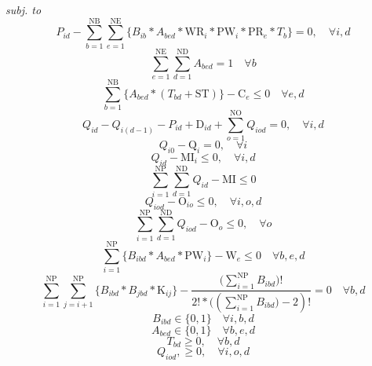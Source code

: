 \emph{subj. to}
\begin{equation}
	P_{id} - \sum_{b=1}^{\mathrm{NB}}{\sum_{e=1}^{\mathrm{NE}}\{B_{ib}*A_{bed}*\mathrm{WR}_i*\mathrm{PW}_i*\mathrm{PR}_e*T_{b}}\}  = 0, \quad \forall{i, d}
	\label{eq:prodQt}
\end{equation}
\begin{equation}
	\sum_{e=1}^{\mathrm{NE}}{\sum_{d=1}^{\mathrm{ND}}{A_{bed}}} = 1 \quad \forall{b}
	\label{eq:batchRest}
\end{equation}
\begin{equation}
	\sum_{b=1}^{\mathrm{NB}}\{A_{bed}*(T_{bd}+\mathrm{ST})\} - \mathrm{C}_e \leq 0 \quad \forall{e, d}
	\label{eq:timeRest}
\end{equation}
\begin{equation}
	Q_{id} - Q_{i(d-1)} - P_{id} + \mathrm{D}_{id} + \sum_{o=1}^{\mathrm{NO}}{Q_{iod}} = 0 , \quad \forall{i, d}
	\label{eq:demSat}
\end{equation}
\begin{equation}
	Q_{i0} - \mathrm{Q}_i = 0, \quad \forall{i}
	\label{eq:demSatBC}
\end{equation}
\begin{equation}
	Q_{id} - \mathrm{MI}_i \leq 0, \quad \forall{i, d}
	\label{eq:invResByProd}
\end{equation}
\begin{equation}
	\sum_{i=1}^{\mathrm{NP}}{\sum_{d=1}^{\mathrm{ND}}{Q_{id}}} - \mathrm{MI} \leq 0
	\label{eq:invRes}
\end{equation}
\begin{equation}
	Q_{iod} - \mathrm{O}_{io} \leq 0, \quad \forall{i, o, d}
	\label{eq:outInvResByProd}
\end{equation}
\begin{equation}
	\sum_{i=1}^{\mathrm{NP}}{\sum_{d=1}^{\mathrm{ND}}{Q_{iod}}} - \mathrm{O}_o \leq 0, \quad \forall{o}
	\label{eq:outInvRes}
\end{equation}
\begin{equation}
	\sum_{i=1}^{\mathrm{NP}}\{B_{ibd}*A_{bed}*\mathrm{PW}_i\} - \mathrm{W}_e \leq 0 \quad \forall{b, e, d}
	\label{eq:widthCap}
\end{equation}
\begin{equation}
	\sum_{i=1}^{\mathrm{NP}}{\sum_{j=i+1}^{\mathrm{NP}}\{B_{ibd}*B_{jbd}*\mathrm{K}_{ij}\}} - \frac{(\sum_{i=1}^{\mathrm{NP}}{B_{ibd})}! }{2! * ((\sum_{i=1}^{\mathrm{NP}}{B_{ibd})} -2)!} = 0 \quad \forall{b, d}
	\label{eq:colourRest}
\end{equation}
\begin{equation}
	B_{ibd}  \in \{0,1\} \quad \forall{i, b, d}
	\label{eq:natVarBinB}
\end{equation}
\begin{equation}
	A_{bed}  \in \{0,1\} \quad \forall{b, e, d}
	\label{eq:natVarBinA}
\end{equation}
\begin{equation}
	T_{bd} \geq 0, \quad \forall{b, d}
	\label{eq:natVar}
\end{equation}
\begin{equation}
	Q_{iod},  \geq 0, \quad \forall{i, o, d}
	\label{eq:natVarO}
\end{equation}

